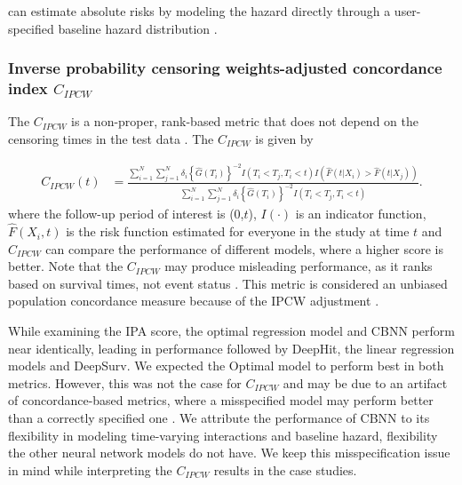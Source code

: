  can estimate absolute
risks by modeling the hazard directly through a user-specified baseline hazard
distribution \citep{kleinbaum2012survival}. 

















\hypertarget{inverse-probability-censoring-weights-adjusted-concordance-index}{%
\subsubsection{Inverse probability censoring weights-adjusted
concordance
index \(C_{IPCW}\)}\label{inverse-probability-censoring-weights-adjusted-concordance-index}}

The \(C_{IPCW}\) is a non-proper, rank-based metric that does not depend
on the censoring times in the test data \citep{uno2011}. The
\(C_{IPCW}\) is given by 

\begin{align} \label{eq:cidx}
C_{IPCW}(t) &= \frac{\sum^{N}_{i=1}\sum^{N}_{j=1}\delta_{i}\left\{\widehat{G}(T_{i})\right\}^{-2} I(T_{i}<T_{j},T_{i}<t) I\left(\widehat{F}(t|X_{i})>\widehat{F}(t|X_{j})\right)}{\sum^{N}_{i=1}\sum^{N}_{j=1}\delta_{i}\left\{\widehat{G}(T_{i})\right\}^{-2} I(T_{i}<T_{j},T_{i}<t)}.
\end{align} where the follow-up period of interest is (0,\(t\)),
\(I(\cdot)\) is an indicator function, \(\widehat{F}(X_{i},t)\) is the
risk function estimated for everyone in the study at time \(t\) and
\(C_{IPCW}\) can compare the performance of different models, where a
higher score is better. Note that the \(C_{IPCW}\) may produce
misleading performance, as it ranks based on survival times, not event
status \citep{cindexfails2019}. This metric is considered an unbiased
population concordance measure because of the IPCW adjustment
\citep{uno2011}.





 While examining the IPA score, the optimal
regression model and CBNN perform near identically, leading in performance followed by 
DeepHit, the linear regression models and DeepSurv. We expected the Optimal model to perform best in both
metrics. However, this was not the case for \(C_{IPCW}\) and may be due
to an artifact of concordance-based metrics, where a misspecified model
may perform better than a correctly specified one
\citep{cindexfails2019}. We attribute the performance of CBNN to its
flexibility in modeling time-varying interactions and baseline hazard,
flexibility the other neural network models do not have. We keep this misspecification issue
in mind while interpreting the \(C_{IPCW}\) results in the case studies.


